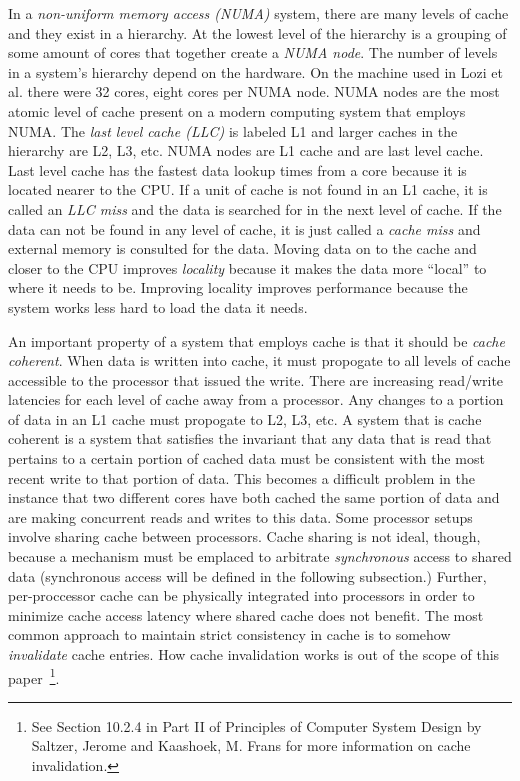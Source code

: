 \documentclass{sig-alternate}
\begin{document}
In a \emph{non-uniform memory access (NUMA)} system, there are many levels of cache and they exist in a hierarchy. At the lowest level of the hierarchy is a grouping of some amount of cores that together create a \emph{NUMA node}. The number of levels in a system's hierarchy depend on the hardware. On the machine used in Lozi et al. there were 32 cores, eight cores per NUMA node. NUMA nodes are the most atomic level of cache present on a modern computing system that employs NUMA. The \emph{last level cache (LLC)} is labeled L1 and larger caches in the hierarchy are L2, L3, etc. NUMA nodes are L1 cache and are last level cache. Last level cache has the fastest data lookup times from a core because it is located nearer to the CPU. If a unit of cache is not found in an L1 cache, it is called an \emph{LLC miss} and the data is searched for in the next level of cache. If the data can not be found in any level of cache, it is just called a \emph{cache miss} and external memory is consulted for the data. Moving data on to the cache and closer to the CPU improves \emph{locality} because it makes the data more ``local'' to where it needs to be. Improving locality improves performance because the system works less hard to load the data it needs.~\cite{WikiCache}


An important property of a system that employs cache is that it should be \emph{cache coherent}. When data is written into cache, it must propogate to all levels of cache accessible to the processor that issued the write. There are increasing read/write latencies for each level of cache away from a processor. Any changes to a portion of data in an L1 cache must propogate to L2, L3, etc. A system that is cache coherent is a system that satisfies the invariant that any data that is read that pertains to a certain portion of cached data must be consistent with the most recent write to that portion of data. This becomes a difficult problem in the instance that two different cores have both cached the same portion of data and are making concurrent reads and writes to this data. Some processor setups involve sharing cache between processors. Cache sharing is not ideal, though, because a mechanism must be emplaced to arbitrate \emph{synchronous} access to shared data (synchronous access will be defined in the following subsection.) Further, per-proccessor cache can be physically integrated into processors in order to minimize cache access latency where shared cache does not benefit. The most common approach to maintain strict consistency in cache is to somehow \emph{invalidate} cache entries. How cache invalidation works is out of the scope of this paper~\footnote{See Section 10.2.4 in Part II of Principles of Computer System Design by Saltzer, Jerome and Kaashoek, M. Frans for more information on cache invalidation.}.~\cite{Systems}
\end{document}
